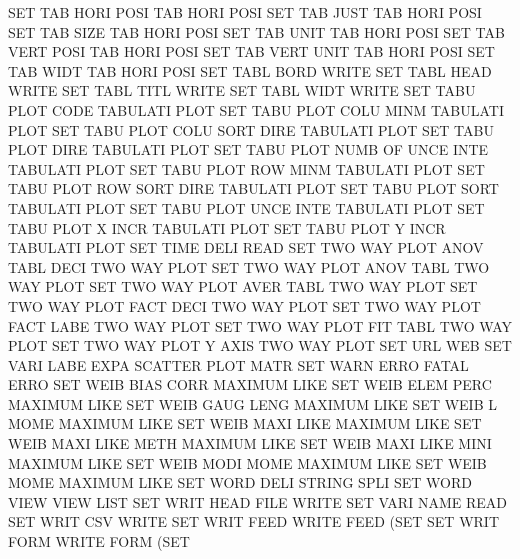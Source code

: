 SET      TAB  HORI POSI                 TAB HORI POSI
SET      TAB  JUST                      TAB HORI POSI
SET      TAB  SIZE                      TAB HORI POSI
SET      TAB  UNIT                      TAB HORI POSI
SET      TAB  VERT POSI                 TAB HORI POSI
SET      TAB  VERT UNIT                 TAB HORI POSI
SET      TAB  WIDT                      TAB HORI POSI
SET      TABL BORD                      WRITE
SET      TABL HEAD                      WRITE
SET      TABL TITL                      WRITE
SET      TABL WIDT                      WRITE
SET      TABU PLOT CODE                 TABULATI PLOT
SET      TABU PLOT COLU MINM            TABULATI PLOT
SET      TABU PLOT COLU SORT DIRE       TABULATI PLOT
SET      TABU PLOT DIRE                 TABULATI PLOT
SET      TABU PLOT NUMB OF   UNCE INTE  TABULATI PLOT
SET      TABU PLOT ROW  MINM            TABULATI PLOT
SET      TABU PLOT ROW  SORT DIRE       TABULATI PLOT
SET      TABU PLOT SORT                 TABULATI PLOT
SET      TABU PLOT UNCE INTE            TABULATI PLOT
SET      TABU PLOT X    INCR            TABULATI PLOT
SET      TABU PLOT Y    INCR            TABULATI PLOT
SET      TIME DELI                      READ
SET      TWO  WAY  PLOT ANOV TABL DECI  TWO      WAY  PLOT
SET      TWO  WAY  PLOT ANOV TABL       TWO      WAY  PLOT
SET      TWO  WAY  PLOT AVER TABL       TWO      WAY  PLOT
SET      TWO  WAY  PLOT FACT DECI       TWO      WAY  PLOT
SET      TWO  WAY  PLOT FACT LABE       TWO      WAY  PLOT
SET      TWO  WAY  PLOT FIT  TABL       TWO      WAY  PLOT
SET      TWO  WAY  PLOT Y    AXIS       TWO      WAY  PLOT
SET      URL                            WEB
SET      VARI LABE EXPA                 SCATTER  PLOT MATR
SET      WARN ERRO                      FATAL    ERRO
SET      WEIB BIAS CORR                 MAXIMUM  LIKE
SET      WEIB ELEM PERC                 MAXIMUM  LIKE
SET      WEIB GAUG LENG                 MAXIMUM  LIKE
SET      WEIB L    MOME                 MAXIMUM  LIKE
SET      WEIB MAXI LIKE                 MAXIMUM  LIKE
SET      WEIB MAXI LIKE METH            MAXIMUM  LIKE
SET      WEIB MAXI LIKE MINI            MAXIMUM  LIKE
SET      WEIB MODI MOME                 MAXIMUM  LIKE
SET      WEIB MOME                      MAXIMUM  LIKE
SET      WORD DELI                      STRING   SPLI
SET      WORD VIEW VIEW                 LIST
SET      WRIT HEAD FILE                 WRITE
SET      VARI NAME                      READ
SET      WRIT CSV                       WRITE
SET      WRIT FEED                      WRITE    FEED (SET
SET      WRIT FORM                      WRITE    FORM (SET
